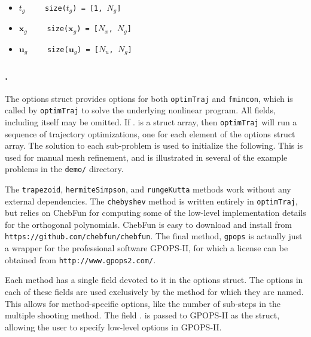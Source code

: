\begin{itemize} \setlength\itemsep{-0.1em}
\item {}\tc{ = }$t_g \qquad$ \texttt{size($t_g$) = [1, $N_g$]}
\item {}\tc{ = }$\bm{x}_g \qquad$ \texttt{size($\bm{x}_g$) = [$N_x$, $N_g$]}
\item {}\tc{ = }$\bm{u}_g \qquad$ \texttt{size($\bm{u}_g$) = [$N_u$, $N_g$]}
\end{itemize}



\subsubsection*{.}

The options struct provides options for both \texttt{optimTraj} and \texttt{fmincon}, which is called by \texttt{optimTraj} to solve the underlying nonlinear program. All fields, including  itself may be omitted. If . is a struct array, then \texttt{optimTraj} will run a sequence of trajectory optimizations, one for each element of the options struct array. The solution to each sub-problem is used to initialize the following. This is used for manual mesh refinement, and is illustrated in several of the example problems in the \texttt{demo/} directory.

\par The \texttt{trapezoid}, \texttt{hermiteSimpson}, and \texttt{rungeKutta} methods work without any external dependencies. The \texttt{chebyshev} method is written entirely in \texttt{optimTraj}, but relies on ChebFun\cite{Driscoll2014} for computing some of the low-level implementation details for the orthogonal polynomials. ChebFun is easy to download and install from \texttt{https://github.com/chebfun/chebfun}. The final method, \texttt{gpops} is actually just a wrapper for the professional software GPOPS-II\cite{Patterson2013}, for which a license can be obtained from \texttt{http://www.gpops2.com/}.

\par Each method has a single field devoted to it in the options struct. The options in each of these fields are used exclusively by the method for which they are named. This allows for method-specific options, like the number of sub-steps in the multiple shooting method. The field . is passed to GPOPS-II as the  struct, allowing the user to specify low-level options in GPOPS-II.

